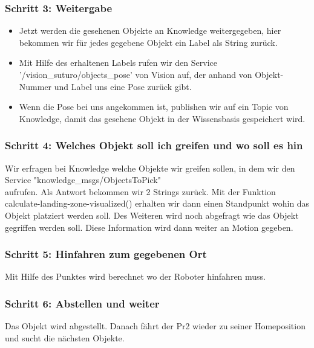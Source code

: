 \documentclass{suturo}
\begin{document}
\subsubsection{Schritt 3: Weitergabe} 

\begin{itemize} 
\item Jetzt werden die gesehenen Objekte an Knowledge weitergegeben, hier bekommen wir für jedes gegebene Objekt ein Label als String zurück.
\item Mit Hilfe des erhaltenen Labels rufen wir den Service '/vision\_suturo/objects\_pose' von Vision auf, der anhand von Objekt-Nummer und Label uns eine Pose zurück gibt.  
\item Wenn die Pose bei uns angekommen ist, publishen wir auf ein Topic von Knowledge, damit das gesehene Objekt in der Wissensbasis gespeichert wird.
\end{itemize}





\subsubsection{Schritt 4: Welches Objekt soll ich greifen und wo soll es hin}
Wir erfragen bei Knowledge welche Objekte wir greifen sollen, in dem wir den Service "knowledge\_msgs/ObjectsToPick" \\
aufrufen. Als Antwort bekommen wir 2 Strings zurück.
Mit der Funktion calculate-landing-zone-visualized() erhalten wir dann einen Standpunkt wohin das Objekt platziert werden soll. %
Des Weiteren wird noch abgefragt wie das Objekt gegriffen werden soll. Diese Information wird dann weiter an Motion gegeben.

\subsubsection{Schritt 5: Hinfahren zum gegebenen Ort}
Mit Hilfe des Punktes wird berechnet wo der Roboter hinfahren muss. 
 
\subsubsection{Schritt 6: Abstellen und weiter}
Das Objekt wird abgestellt.
Danach fährt der Pr2 wieder zu seiner Homeposition und sucht die nächsten Objekte.
\end{document}
